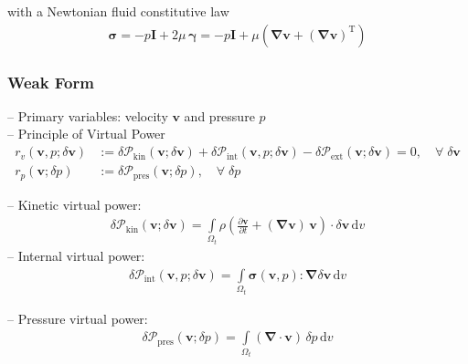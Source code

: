 \documentclass[a4paper,12pt]{report}
\newcommand{\bs}[1]{\boldsymbol{#1}}
\newcommand{\Om}{\mathit{\Omega}}
\begin{document}
with a Newtonian fluid constitutive law
\begin{align}
\bs{\sigma} = -p \bs{I} + 2 \mu\,\bs{\gamma} = -p \bs{I} + \mu \left(\bs{\nabla} \bs{v} + (\bs{\nabla} \bs{v})^{\mathrm{T}}\right)
\end{align}

\subsubsection{Weak Form}
-- Primary variables: velocity $\bs{v}$ and pressure $p$\\

-- Principle of Virtual Power
\begin{align}
r_v(\bs{v},p;\delta\bs{v}) &:= \delta \mathcal{P}_{\mathrm{kin}}(\bs{v};\delta\bs{v}) + \delta \mathcal{P}_{\mathrm{int}}(\bs{v},p;\delta\bs{v}) - \delta \mathcal{P}_{\mathrm{ext}}(\bs{v};\delta\bs{v}) = 0, \quad \forall \; \delta\bs{v} \label{eq:res_v_fluid}\\
r_p(\bs{v};\delta p) &:= \delta \mathcal{P}_{\mathrm{pres}}(\bs{v};\delta p), \quad \forall \; \delta p \label{eq:res_p_fluid}
\end{align}

-- Kinetic virtual power:
\begin{align}
\delta \mathcal{P}_{\mathrm{kin}}(\bs{v};\delta\bs{v}) = \int\limits_{\Om_t} \rho\left(\frac{\partial\bs{v}}{\partial t} + (\bs{\nabla}\bs{v})\,\bs{v}\right) \cdot \delta\bs{v} \,\mathrm{d}v
\end{align}
-- Internal virtual power:
\begin{align}
\delta \mathcal{P}_{\mathrm{int}}(\bs{v},p;\delta\bs{v}) = 
\int\limits_{\Om_t} \bs{\sigma}(\bs{v},p) : \bs{\nabla} \delta\bs{v} \,\mathrm{d}v 
\end{align}

-- Pressure virtual power:
\begin{align}
\delta \mathcal{P}_{\mathrm{pres}}(\bs{v};\delta p) = 
\int\limits_{\Om_t} (\bs{\nabla}\cdot\bs{v})\,\delta p\,\mathrm{d}v
\end{align}
\end{document}
